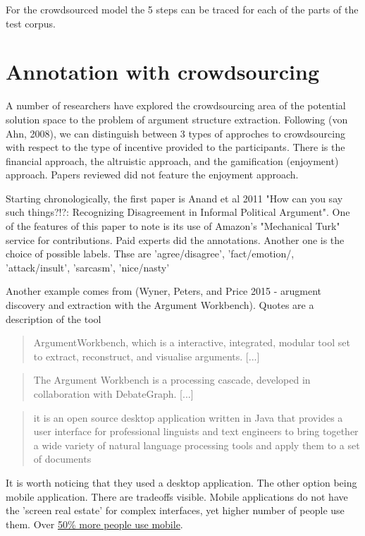 \documentclass{article}
\begin{document}
For the crowdsourced model the 5 steps can be traced for each of the parts of the test corpus. 

\section{Annotation with crowdsourcing}
A number of researchers have explored the crowdsourcing area of the potential solution space to the problem of argument structure extraction.
Following (von Ahn, 2008), we can distinguish between 3 types of approches to crowdsourcing with respect to the type of incentive provided to the participants.
There is the financial approach, the altruistic approach, and the gamification (enjoyment) approach. Papers reviewed did not feature the enjoyment approach.

Starting chronologically, the first paper is Anand et al 2011 "How can you say such things?!?: Recognizing Disagreement in Informal Political Argument".
One of the features of this paper to note is its use of Amazon's "Mechanical Turk" service for contributions. Paid experts did the annotations.
Another one is the choice of possible labels. Thse are 'agree/disagree', 'fact/emotion/, 'attack/insult', 'sarcasm', 'nice/nasty'

Another example comes from (Wyner, Peters, and Price 2015 - arugment discovery and extraction with the Argument Workbench).
Quotes are a description of the tool
\begin{quote}
 ArgumentWorkbench, which is a interactive, integrated, modular tool set to extract, reconstruct, and visualise arguments. [...]
\end{quote}
\begin{quote}
 The Argument Workbench is a processing cascade, developed in collaboration with DebateGraph. [...]
\end{quote}
\begin{quote}
 it is an open source desktop application written in Java that provides a user interface for professional linguists and text engineers to bring together a wide variety of natural language processing tools and apply them to a set of documents
\end{quote}

It is worth noticing that they used a desktop application. The other option being mobile application. There are tradeoffs visible.
Mobile applications do not have the 'screen real estate' for complex interfaces, yet higher number of people use them. Over \href{https://gs.statcounter.com/platform-market-share/desktop-mobile-tablet}{50\% more people use mobile}.
\end{document}
